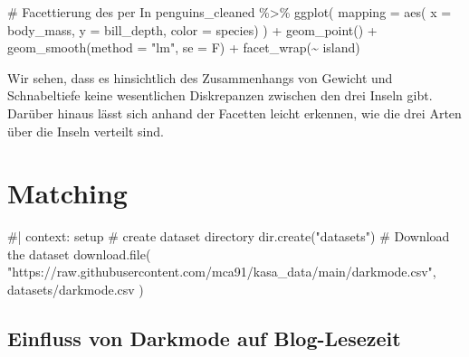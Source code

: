 \documentclass[
  a4paper,
  DIV=11,
  oneside]{scrreprt}
\newenvironment{Shaded}{\begin{snugshade}}{\end{snugshade}}
\newcommand{\NormalTok}[1]{\textcolor[rgb]{0.00,0.23,0.31}{#1}}
\begin{document}
\begin{Shaded}
\begin{Highlighting}[]
\NormalTok{\# Facettierung des per In}
\NormalTok{penguins\_cleaned \%\textgreater{}\%}
\NormalTok{  ggplot(}
\NormalTok{    mapping = aes(}
\NormalTok{      x = body\_mass, }
\NormalTok{      y = bill\_depth, }
\NormalTok{      color = species)}
\NormalTok{  ) +}
\NormalTok{  geom\_point() +}
\NormalTok{  geom\_smooth(method = "lm", se = F) +}
\NormalTok{  facet\_wrap(\textasciitilde{} island)}
\end{Highlighting}
\end{Shaded}

Wir sehen, dass es hinsichtlich des Zusammenhangs von Gewicht und
Schnabeltiefe keine wesentlichen Diskrepanzen zwischen den drei Inseln
gibt. Darüber hinaus lässt sich anhand der Facetten leicht erkennen, wie
die drei Arten über die Inseln verteilt sind.


\hypertarget{matching}{%
\chapter{Matching}\label{matching}}

\begin{Shaded}
\begin{Highlighting}[]
\NormalTok{\#| context: setup}
\NormalTok{\# create dataset directory}
\NormalTok{dir.create("datasets")}
\NormalTok{\# Download the dataset}
\NormalTok{download.file(}
\NormalTok{    "https://raw.githubusercontent.com/mca91/kasa\_data/main/darkmode.csv",}
\NormalTok{    \textquotesingle{}datasets/darkmode.csv\textquotesingle{}}
\NormalTok{)}
\end{Highlighting}
\end{Shaded}

\hypertarget{einfluss-von-darkmode-auf-blog-lesezeit}{%
\section{Einfluss von Darkmode auf
Blog-Lesezeit}\label{einfluss-von-darkmode-auf-blog-lesezeit}}
\end{document}
